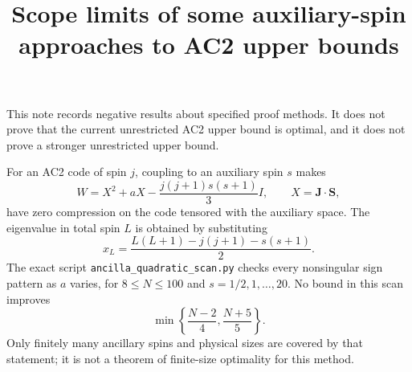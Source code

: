 \documentclass[11pt]{article}
\begin{document}
\title{Scope limits of some auxiliary-spin approaches to AC2 upper bounds}
\author{}\date{}\maketitle

This note records negative results about specified proof methods. It does
not prove that the current unrestricted AC2 upper bound is optimal, and
it does not prove a stronger unrestricted upper bound.

For an AC2 code of spin $j$, coupling to an auxiliary spin $s$ makes
\[
 W=X^2+aX-\frac{j(j+1)s(s+1)}3I,\qquad X=\mathbf J\cdot\mathbf S,
\]
have zero compression on the code tensored with the auxiliary space.
The eigenvalue in total spin $L$ is obtained by substituting
\[
 x_L=\frac{L(L+1)-j(j+1)-s(s+1)}2.
\]
The exact script \texttt{ancilla\_quadratic\_scan.py} checks every
nonsingular sign pattern as $a$ varies, for $8\le N\le100$ and
$s=1/2,1,\ldots,20$. No bound in this scan improves
\[
 \min\left\{\frac{N-2}{4},\frac{N+5}{5}\right\}.
\]
Only finitely many ancillary spins and physical sizes are covered by that
statement; it is not a theorem of finite-size optimality for this method.
\end{document}
